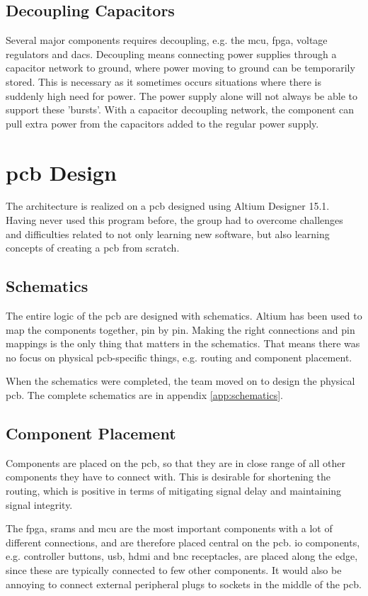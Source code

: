 \subsection{Decoupling Capacitors}
Several major components requires decoupling, e.g. the \gls{mcu}, \gls{fpga}, voltage regulators and \gls{dac}s.
Decoupling means connecting power supplies through a capacitor network to ground, where power moving to ground can be temporarily stored.
This is necessary as it sometimes occurs situations where there is suddenly high need for power.
The power supply alone will not always be able to support these 'bursts'.
With a capacitor decoupling network, the component can pull extra power from the capacitors added to the regular power supply.

\section{\gls{pcb} Design}
The architecture is realized on a \gls{pcb} designed using Altium Designer 15.1.
Having never used this program before, the group had to overcome challenges and difficulties related to not only learning new software, but also learning concepts of creating a \gls{pcb} from scratch.

\subsection{Schematics}
The entire logic of the \gls{pcb} are designed with schematics.
Altium has been used to map the components together, pin by pin.
Making the right connections and pin mappings is the only thing that matters in the schematics.
That means there was no focus on physical \gls{pcb}-specific things, e.g. routing and component placement.

When the schematics were completed, the team moved on to design the physical \gls{pcb}.
The complete schematics are in appendix \ref{app:schematics}.

\subsection{Component Placement}
Components are placed on the \gls{pcb}, so that they are in close range of all other components they have to connect with.
This is desirable for shortening the routing, which is positive in terms of mitigating signal delay and maintaining signal integrity.

The \gls{fpga}, \gls{sram}s and \gls{mcu} are the most important components with a lot of different connections, and are therefore placed central on the \gls{pcb}.
\gls{io} components, e.g. controller buttons, \gls{usb}, \gls{hdmi} and \gls{bnc} receptacles, are placed along the edge, since these are typically connected to few other components.
It would also be annoying to connect external peripheral plugs to sockets in the middle of the \gls{pcb}.


